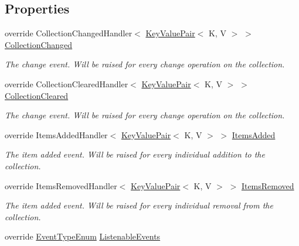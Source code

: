 \subsection*{Properties}
\begin{DoxyCompactItemize}
\item 
override Collection\+Changed\+Handler$<$ \hyperlink{struct_c5_1_1_key_value_pair}{Key\+Value\+Pair}$<$ K, V $>$ $>$ \hyperlink{class_c5_1_1_dictionary_base_a751f335fff07b5b00a6d9a2d4bb99efa}{Collection\+Changed}
\begin{DoxyCompactList}\small\item\em The change event. Will be raised for every change operation on the collection. \end{DoxyCompactList}\item 
override Collection\+Cleared\+Handler$<$ \hyperlink{struct_c5_1_1_key_value_pair}{Key\+Value\+Pair}$<$ K, V $>$ $>$ \hyperlink{class_c5_1_1_dictionary_base_ac350f18d63173c7fea97844a5f62f461}{Collection\+Cleared}
\begin{DoxyCompactList}\small\item\em The change event. Will be raised for every change operation on the collection. \end{DoxyCompactList}\item 
override Items\+Added\+Handler$<$ \hyperlink{struct_c5_1_1_key_value_pair}{Key\+Value\+Pair}$<$ K, V $>$ $>$ \hyperlink{class_c5_1_1_dictionary_base_a3a1267cb8e0b1d260ce133d3961b2c59}{Items\+Added}
\begin{DoxyCompactList}\small\item\em The item added event. Will be raised for every individual addition to the collection. \end{DoxyCompactList}\item 
override Items\+Removed\+Handler$<$ \hyperlink{struct_c5_1_1_key_value_pair}{Key\+Value\+Pair}$<$ K, V $>$ $>$ \hyperlink{class_c5_1_1_dictionary_base_a2bdc1bb2f3e3b2024eff8f1f8710763c}{Items\+Removed}
\begin{DoxyCompactList}\small\item\em The item added event. Will be raised for every individual removal from the collection. \end{DoxyCompactList}\item 
override \hyperlink{namespace_c5_a9143bfd561fffa025d21561674758008}{Event\+Type\+Enum} \hyperlink{class_c5_1_1_dictionary_base_aa1a18f583bfe9f40a24d53b9638d1962}{Listenable\+Events}

\end{DoxyCompactItemize}
